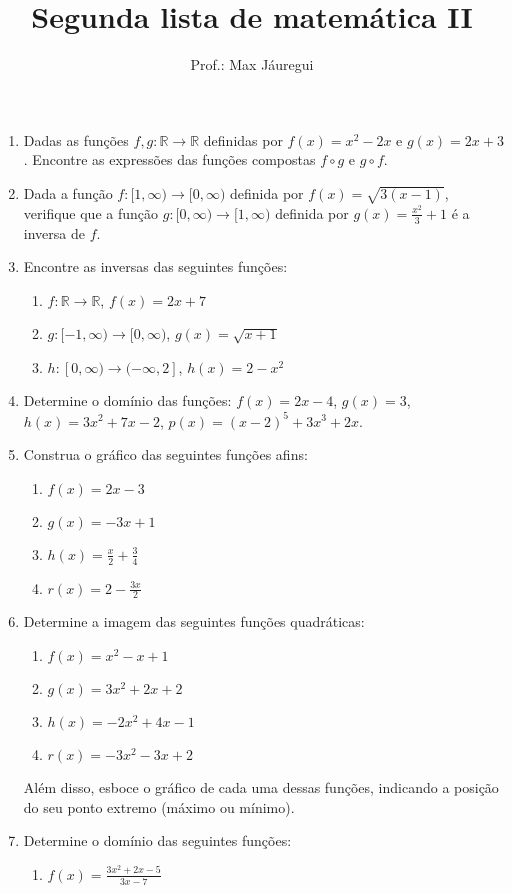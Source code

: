 \documentclass[12pt,a4paper]{article}
\title{Segunda lista de matemática II}
\author{Prof.: Max Jáuregui}
\date{}
\newcommand{\ds}{\displaystyle}
\newcommand{\R}{\mathbb{R}}
\begin{document}
\maketitle

\begin{enumerate}
  \item Dadas as funções $f,g:\R\to\R$ definidas por $f(x)=x^2-2x$ e $g(x)=2x+3$. Encontre as expressões das funções compostas $f\circ g$ e $g\circ f$.
  \item Dada a função $f:[1,\infty)\to[0,\infty)$ definida por $f(x)=\sqrt{3(x-1)}$, verifique que a função $g:[0,\infty)\to[1,\infty)$ definida por $\ds g(x)=\frac{x^2}{3}+1$ é a inversa de $f$.
  \item Encontre as inversas das seguintes funções:
  \begin{enumerate}
    \item $f:\R\to\R$, $f(x)=2x+7$
    \item $g:[-1,\infty)\to [0,\infty)$, $g(x)=\sqrt{x+1}$
    \item $h:[0,\infty)\to (-\infty,2]$, $h(x)=2-x^2$
  \end{enumerate}
  \item Determine o domínio das funções: $f(x)=2x-4$, $g(x)=3$, $h(x)=3x^2+7x-2$, $p(x)=(x-2)^5+3x^3+2x$.
  \item Construa o gráfico das seguintes funções afins:
  \begin{enumerate}
    \item $f(x)=2x-3$
    \item $g(x)=-3x+1$
    \item $\ds h(x)=\frac{x}{2}+\frac{3}{4}$
    \item $\ds r(x)=2-\frac{3x}{2}$
  \end{enumerate}
  \item Determine a imagem das seguintes funções quadráticas:
  \begin{enumerate}
    \item $f(x)=x^2-x+1$
    \item $g(x)=3x^2+2x+2$
    \item $h(x)=-2x^2+4x-1$
    \item $r(x)=-3x^2-3x+2$
  \end{enumerate}
  Além disso, esboce o gráfico de cada uma dessas funções, indicando a posição do seu ponto extremo (máximo ou mínimo).
  \item Determine o domínio das seguintes funções:
  \begin{enumerate}
    \item $\ds f(x)=\frac{3x^2+2x-5}{3x-7}$

\end{enumerate}
\end{enumerate}
\end{document}

